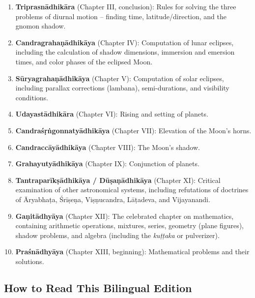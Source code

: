 \documentclass[11pt,a4paper]{article}
\begin{document}
\begin{enumerate}[label=\textbf{\arabic*.}]
  \item \textbf{Triprasnādhikāra} (Chapter III, conclusion): Rules for solving the three
  problems of diurnal motion -- finding time, latitude/direction, and the gnomon shadow.

  \item \textbf{Candragrahaṇādhikāya} (Chapter IV): Computation of lunar eclipses,
  including the calculation of shadow dimensions, immersion and emersion times, and color
  phases of the eclipsed Moon.

  \item \textbf{Sūryagrahaṇādhikāya} (Chapter V): Computation of solar eclipses,
  including parallax corrections (lambana), semi-durations, and visibility conditions.

  \item \textbf{Udayastādhikāra} (Chapter VI): Rising and setting of planets.

  \item \textbf{Candraśṛṅgonnatyādhikāya} (Chapter VII): Elevation of the Moon's horns.

  \item \textbf{Candraccāyādhikāya} (Chapter VIII): The Moon's shadow.

  \item \textbf{Grahayutyādhikāya} (Chapter IX): Conjunction of planets.

  \item \textbf{Tantraparīkṣādhikāya / Dūṣaṇādhikāya} (Chapter XI): Critical examination
  of other astronomical systems, including refutations of doctrines of Āryabhaṭa, Śrīṣeṇa,
  Viṣṇucandra, Lāṭadeva, and Vijayanandi.

  \item \textbf{Gaṇitādhyāya} (Chapter XII): The celebrated chapter on mathematics,
  containing arithmetic operations, mixtures, series, geometry (plane figures),
  shadow problems, and algebra (including the \textit{kuṭṭaka} or pulverizer).

  \item \textbf{Praśnādhyāya} (Chapter XIII, beginning): Mathematical problems and
  their solutions.
\end{enumerate}

\subsection*{How to Read This Bilingual Edition}
\end{document}
